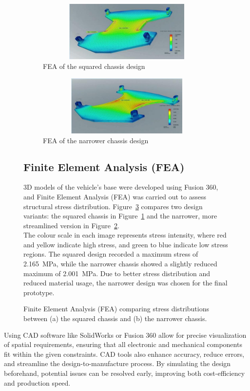 \documentclass{article}
\begin{document}
\begin{figure}[H]
	\begin{minipage}{0.45\textwidth}
	\centering
	\begin{subfigure}[t]{0.45\textwidth}
		\centering
		\includegraphics[width=1\textwidth,height=3cm]{images/feaone.png}
		\caption{FEA of the squared chassis design}
		\label{fig:fea_squared}
	\end{subfigure}%
	\hfill
	\begin{subfigure}[t]{0.45\textwidth}
		\centering
		\includegraphics[width=1\textwidth,height=3cm]{images/featwo.png}
		\caption{FEA of the narrower chassis design}
		\label{fig:fea_narrow}
	\end{subfigure}
	\caption{Finite Element Analysis (FEA) comparing stress distributions between (a) the squared chassis and (b) the narrower chassis.}
	\label{fig:fea_comparison}
	\end{minipage}\hfill
	\begin{minipage}{0.5\textwidth}
		\subsection{Finite Element Analysis (FEA)}
		3D models of the vehicle’s base were developed using Fusion 360, and Finite Element Analysis (FEA) was carried out to assess structural stress distribution. Figure~\ref{fig:fea_comparison} compares two design variants: the squared chassis in Figure~\ref{fig:fea_squared} and the narrower, more streamlined version in Figure~\ref{fig:fea_narrow}.\\[8pt]
		The colour scale in each image represents stress intensity, where red and yellow indicate high stress, and green to blue indicate low stress regions. The squared design recorded a maximum stress of 2.165~MPa, while the narrower chassis showed a slightly reduced maximum of 2.001~MPa. Due to better stress distribution and reduced material usage, the narrower design was chosen for the final prototype.
	\end{minipage}		
\end{figure}\noindent
Using CAD software like SolidWorks or Fusion 360 allow for precise visualization of spatial requirements, ensuring that all electronic and mechanical components fit within the given constraints. CAD tools also enhance accuracy, reduce errors, and streamline the design-to-manufacture process. By simulating the design beforehand, potential issues can be resolved early, improving both cost-efficiency and production speed.
\end{document}
